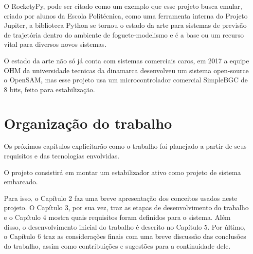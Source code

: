 O RocketyPy, pode ser citado como um exemplo que esse projeto busca emular, criado por alunos da Escola Politécnica, como uma ferramenta interna do Projeto Jupiter, a biblioteca Python se tornou o estado da arte para sistemas de previsão de trajetória dentro do ambiente de foguete-modelismo e é a base ou um recurso vital para diversos novos sistemas.

O estado da arte não só já conta com sistemas comerciais caros, em 2017 a equipe OHM da universidade tecnicas da dinamarca desenvolveu um sistema open-source o OpenSAM, mas esse projeto usa um microcontrolador comercial SimpleBGC de 8 bits, feito para estabilização. 

\section{Organização do trabalho}
Os próximos capítulos explicitarão como o trabalho foi planejado a partir de seus requisitos e das tecnologias envolvidas.

O projeto consistirá em montar um estabilizador ativo como projeto de sistema embarcado.

Para isso, o Capítulo 2 faz uma breve apresentação dos conceitos usados neste projeto. O Capítulo 3, por sua vez, traz as etapas de desenvolvimento do trabalho e o Capítulo 4 mostra quais requisitos foram definidos para o sistema. Além disso, o desenvolvimento inicial do trabalho é descrito no Capítulo 5. Por último, o Capítulo 6 traz as considerações finais com uma breve discussão das conclusões do trabalho, assim como contribuições e sugestões para a continuidade dele.
